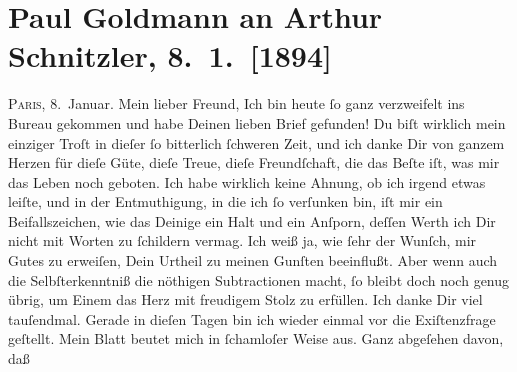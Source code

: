 

         
         \renewcommand{\erwaehntePersonen}{Personen: Paul Goldmann, Felix Salten}
         \renewcommand{\erwaehnteInstitutionen}{Institutionen: Frankfurter Zeitung}
         \renewcommand{\erwaehnteOrte}{Orte: Paris, Wien, rue Richelieu}
         \renewcommand{\erwaehnteWerke}{Werke: Anatol}
               \section[Paul Goldmann an Arthur Schnitzler, 8. 1. {[}1894{]}]{ Paul Goldmann an Arthur Schnitzler, 8. 1. {[}1894{]}}\nopagebreak{}\rehead{ }\begin{ledgroupsized}[t]{13cm}\normalsize\beginnumbering \toendnotes[C]{\smallbreak\pagebreak[2]} 
\toendnotes[C]{\smallbreak}\pstart
           \raggedleft{}{\pb}\textsc{Paris,}{ }8. Januar.\pend
           \pstart\center{}Mein lieber Freund,\pend\pstart
           Ich bin heute ſo ganz verzweifelt ins Bureau gekommen und habe Deinen lieben Brief gefunden! Du
               biſt wirklich mein einziger Troſt in dieſer ſo bitterlich ſchweren Zeit, und ich
               danke Dir von ganzem Herzen für dieſe Güte, dieſe Treue, dieſe Freundſchaft, die das
               Beſte iſt, was mir das Leben noch geboten. Ich habe wirklich keine Ahnung, ob ich
               irgend etwas leiſte, und in der Entmuthigung, in die ich ſo verſunken bin, iſt mir
                  ein\strikeout{\textcolor{gray}{e}} Beifallszeichen, wie das Deinige ein Halt und {\pb}ein Anſporn, deſſen Werth ich Dir nicht mit Worten zu ſchildern vermag. Ich weiß
               ja, wie ſehr der Wunſch, mir Gutes zu erweiſen, Dein Urtheil zu meinen Gunſten
               beeinflußt. Aber wenn auch die Selbſterkenntniß die nöthigen Subtractionen macht, ſo
               bleibt doch noch genug übrig, um Einem das Herz mit freudigem Stolz zu erfüllen. Ich
               danke Dir viel tauſendmal.\pend
           \pstart
           Gerade in dieſen Tagen bin ich wieder einmal vor die Exiſtenzfrage geſtellt. Mein Blatt beutet mich {\pb}in ſchamloſer Weise aus. Ganz abgeſehen davon, daß

\end{ledgroupsized}
